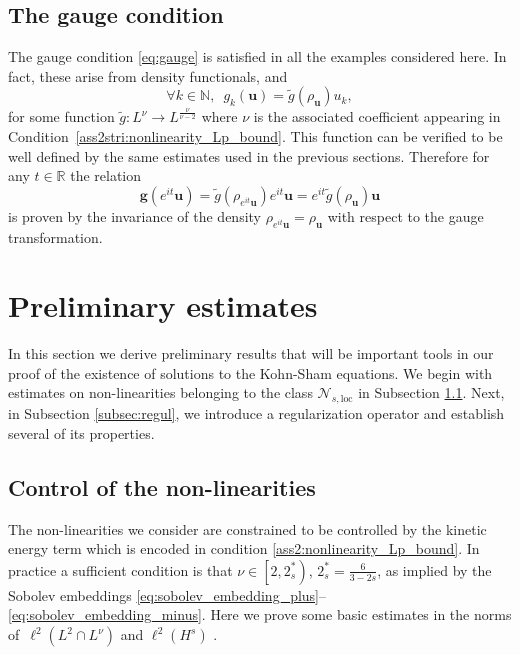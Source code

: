 \documentclass[12pt,a4paper]{amsart}
\numberwithin{equation}{section}
\newcommand{\ulu}{\boldsymbol{u}}
\newcommand{\ulg}{\boldsymbol{g}}
\newcommand{\twoasts}{{2^*_s}}
\newcommand{\Nloc}{\mathscr{N}_{s,\mathrm{loc}}}
\begin{document}
	
	\subsection{The gauge condition}\label{subsec:gauge} 
	
	The gauge condition \eqref{eq:gauge} is satisfied in all the examples considered here. In fact, these arise from density functionals, and 
	\begin{equation}
		\forall k \in \mathbb{N}, \;\ g_k(\ulu) = \tilde{g}(\rho_{\ulu}) u_k,
	\end{equation}
	for some function $\tilde{g} : L^\nu \rightarrow L^{\frac{\nu}{\nu-2}} $ where $\nu$ is the associated coefficient appearing in Condition~\ref{ass2stri:nonlinearity_Lp_bound}. This function can be verified to be well defined by the same estimates used in the previous sections. Therefore for any $t \in \mathbb{R}$ the relation 
	\begin{equation}
		\ulg(e^{it}\ulu) = \tilde{g}(\rho_{e^{it}\ulu}) e^{it} \ulu = e^{it} \tilde{g}(\rho_{\ulu}) \ulu 
	\end{equation}
	is proven by the invariance of the density $ \rho_{e^{it} \ulu} = \rho_{\ulu} $ with respect to the gauge transformation. 
	
	\section{Preliminary estimates}\label{sec:prelim}
	
	In this section we derive preliminary results that will be important tools in our proof of the existence of solutions to the Kohn-Sham equations. We begin with estimates on non-linearities belonging to the class $\Nloc$ in Subsection \ref{subsec:control-NL}. Next, in Subsection \ref{subsec:regul}, we introduce a regularization operator and establish several of its properties.  
	
	\subsection{Control of the non-linearities}\label{subsec:control-NL}
	The non-linearities we consider are constrained to be controlled by the kinetic energy term which is encoded in condition \ref{ass2:nonlinearity_Lp_bound}.
	In practice a sufficient condition is that $ \nu \in \left[ 2 , \twoasts  \right) $, $ \twoasts  = \frac{6}{3-2s}$, as implied by the Sobolev embeddings \eqref{eq:sobolev_embedding_plus}--\eqref{eq:sobolev_embedding_minus}. Here we prove some basic estimates in the norms of~$ \ell^2(L^2\cap L^\nu) $ and $ \ell^2(H^s) $ .
	
\end{document}
